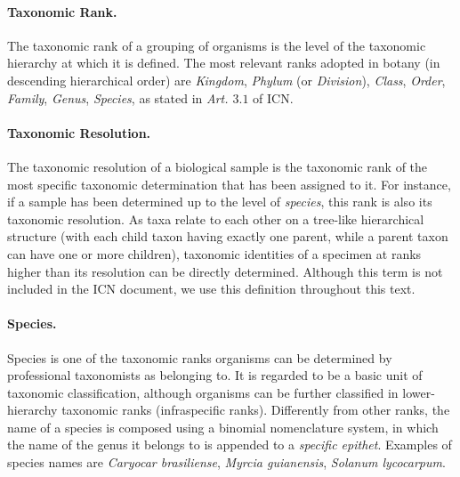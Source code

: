 \paragraph*{Taxonomic Rank.}
The taxonomic rank of a grouping of organisms is the level of the taxonomic hierarchy at which it is defined. The most relevant ranks adopted in botany (in descending hierarchical order) are \textit{Kingdom}, \textit{Phylum} (or \textit{Division}), \textit{Class}, \textit{Order}, \textit{Family}, \textit{Genus}, \textit{Species}, as stated in \textit{Art. $3.1$} of ICN.

\paragraph*{Taxonomic Resolution.}
The taxonomic resolution of a biological sample is the taxonomic rank of the most specific taxonomic determination that has been assigned to it.
For instance, if a sample has been determined up to the level of \textit{species}, this rank is also its taxonomic resolution.
As taxa relate to each other on a tree-like hierarchical structure (with each child taxon having exactly one parent, while a parent taxon can have one or more children), taxonomic identities of a specimen at ranks higher than its resolution can be directly determined.
Although this term is not included in the ICN document, we use this definition throughout this text.

\paragraph*{Species.}
Species is one of the taxonomic ranks organisms can be determined by professional taxonomists as belonging to. It is regarded to be a basic unit of taxonomic classification, although organisms can be further classified in lower-hierarchy taxonomic ranks (infraspecific ranks).
Differently from other ranks, the name of a species is composed using a binomial nomenclature system, in which the name of the genus it belongs to is appended to a \textit{specific epithet}.
Examples of species names are \textit{Caryocar brasiliense}, \textit{Myrcia guianensis}, \textit{Solanum lycocarpum}.

